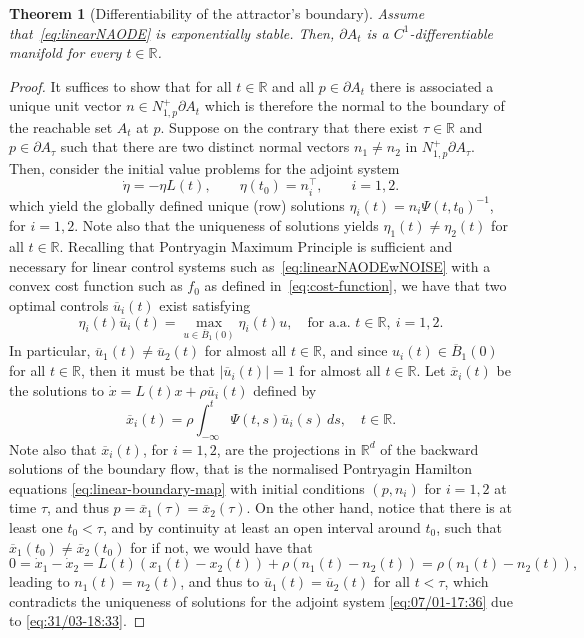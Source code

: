 \documentclass[reqno]{amsart}
\newtheorem{thm}{Theorem}[section]
\theoremstyle{definition}
\numberwithin{equation}{section}
\newcommand{\R}{\mathbb{R}}
\begin{document}
\begin{thm}[Differentiability of the attractor's boundary]\label{thm:linear-boundary-C1}
    Assume that~\eqref{eq:linearNAODE} is exponentially stable. Then, $\partial A_t$ is a $C^1$-differentiable manifold for every $t\in\R$.
\end{thm}
\begin{proof}


  It suffices to show that for all $t\in\R$ and all $p\in \partial A_t$ there is associated a unique unit vector $n\in N_{1,p}^+\partial A_t$ which is therefore the normal to the boundary of the reachable set $A_t$ at $p$. Suppose on the contrary that there exist $\tau \in \mathbb{R}$ and $p\in\partial A_\tau$  such that there are two distinct normal vectors $n_1\ne n_2$ in $N_{1,p}^+\partial A_{\tau}$. Then, consider the initial value problems for the adjoint system 
    \begin{equation}\label{eq:07/01-17:36}
    \dot \eta =-\eta L(t),\qquad \eta(t_0)=n_i^\top, \qquad i=1,2.
 \end{equation}
    which yield the globally defined unique (row) solutions $\eta_i(t)=n_i\Psi(t,t_0)^{-1}$, for $i=1,2$. Note also that the uniqueness of solutions yields $\eta_1(t)\neq\eta_2(t)$ for all $t\in\R$. Recalling that Pontryagin Maximum Principle is sufficient and necessary for linear control systems such as~\eqref{eq:linearNAODEwNOISE} with a convex cost function such as $f_0$ as defined in~\eqref{eq:cost-function}, we have that two optimal controls $\overline u_i(t)$ exist satisfying
    \begin{equation}\label{eq:31/03-18:33}
    \eta_i(t)\overline u_i(t)=\max_{u\in \overline B_1(0)}\eta_i(t)u, \quad \text{for a.a. }t\in\R, \ i=1,2.
    \end{equation}
    In particular, $\overline u_1(t)\neq \overline u_2(t)$ for almost all $t\in\R$, and since $u_i(t)\in \overline B_1(0)$ for all $t\in\R$, then it must be that $|\overline u_i(t)|=1$ for almost all $t\in\R$. Let $\overline x_i(t)$ be the solutions to $\dot x =L(t)x+\rho\overline u_i(t)$ defined by
    \[
    \overline x_i(t)=\rho\int_{-\infty}^t\Psi(t,s)\overline u_i(s)\, ds,\quad t\in\R.
    \]
Note also that  $\overline x_i(t)$, for $i=1,2$, are the projections in $\mathbb{R}^d$ of the backward solutions of the boundary flow, that is the normalised Pontryagin Hamilton equations \eqref{eq:linear-boundary-map} with initial conditions $(p,n_i)$ for $i=1,2$ at time $\tau$, and thus $p=\overline x_1(\tau)=\overline x_2(\tau)$. On the other hand, notice that there is at least one $t_0<\tau$, and by continuity at least an open interval around $t_0$, such that $\overline x_1(t_0)\ne \overline x_2(t_0)$ for if not, we would have that
  \[0=\dot{x}_1-\dot{x}_2=L(t)(x_1(t)-x_2(t))+\rho (n_1(t)-n_2(t))=\rho (n_1(t)-n_2(t)),\]
  leading to $n_1(t)=n_2(t)$, and thus to $\overline u_1(t)=\overline u_2(t)$ for all $t< \tau$, which contradicts the uniqueness of solutions for the adjoint system \eqref{eq:07/01-17:36} due to \eqref{eq:31/03-18:33}.
  

\end{proof}
\end{document}
